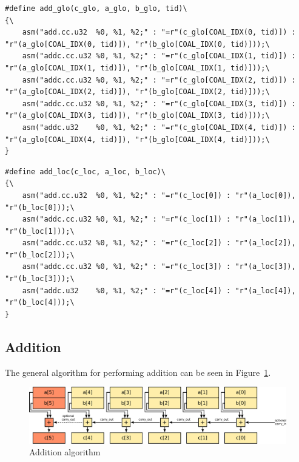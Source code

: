 \documentclass[10pt, a4paper]{report}
\begin{document}
\begin{lstlisting}
#define add_glo(c_glo, a_glo, b_glo, tid)\
{\
    asm("add.cc.u32  %0, %1, %2;" : "=r"(c_glo[COAL_IDX(0, tid)]) : "r"(a_glo[COAL_IDX(0, tid)]), "r"(b_glo[COAL_IDX(0, tid)]));\
    asm("addc.cc.u32 %0, %1, %2;" : "=r"(c_glo[COAL_IDX(1, tid)]) : "r"(a_glo[COAL_IDX(1, tid)]), "r"(b_glo[COAL_IDX(1, tid)]));\
    asm("addc.cc.u32 %0, %1, %2;" : "=r"(c_glo[COAL_IDX(2, tid)]) : "r"(a_glo[COAL_IDX(2, tid)]), "r"(b_glo[COAL_IDX(2, tid)]));\
    asm("addc.cc.u32 %0, %1, %2;" : "=r"(c_glo[COAL_IDX(3, tid)]) : "r"(a_glo[COAL_IDX(3, tid)]), "r"(b_glo[COAL_IDX(3, tid)]));\
    asm("addc.u32    %0, %1, %2;" : "=r"(c_glo[COAL_IDX(4, tid)]) : "r"(a_glo[COAL_IDX(4, tid)]), "r"(b_glo[COAL_IDX(4, tid)]));\
}
\end{lstlisting}

\begin{lstlisting}
#define add_loc(c_loc, a_loc, b_loc)\
{\
    asm("add.cc.u32  %0, %1, %2;" : "=r"(c_loc[0]) : "r"(a_loc[0]), "r"(b_loc[0]));\
    asm("addc.cc.u32 %0, %1, %2;" : "=r"(c_loc[1]) : "r"(a_loc[1]), "r"(b_loc[1]));\
    asm("addc.cc.u32 %0, %1, %2;" : "=r"(c_loc[2]) : "r"(a_loc[2]), "r"(b_loc[2]));\
    asm("addc.cc.u32 %0, %1, %2;" : "=r"(c_loc[3]) : "r"(a_loc[3]), "r"(b_loc[3]));\
    asm("addc.u32    %0, %1, %2;" : "=r"(c_loc[4]) : "r"(a_loc[4]), "r"(b_loc[4]));\
}
\end{lstlisting}

\subsection{Addition}
The general algorithm for performing addition can be seen in
Figure~\ref{fig:addition}.

\begin{figure}[h]
\centering
\includegraphics[width=\linewidth]{figs/addition}
\caption{Addition algorithm}
\label{fig:addition}
\end{figure}
\end{document}
